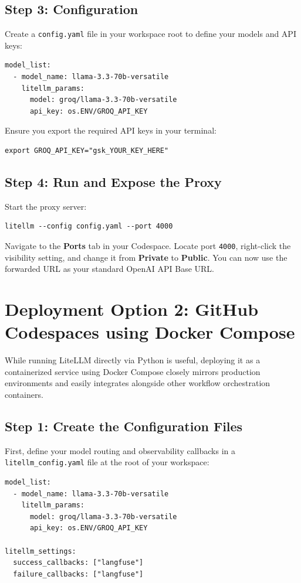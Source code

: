 \documentclass[12pt,a4paper]{article}
\begin{document}
\subsection{Step 3: Configuration}
Create a \texttt{config.yaml} file in your workspace root to define your models and API keys:
\begin{verbatim}
model_list:
  - model_name: llama-3.3-70b-versatile
    litellm_params:
      model: groq/llama-3.3-70b-versatile
      api_key: os.ENV/GROQ_API_KEY
\end{verbatim}
Ensure you export the required API keys in your terminal:
\begin{verbatim}
export GROQ_API_KEY="gsk_YOUR_KEY_HERE"
\end{verbatim}

\subsection{Step 4: Run and Expose the Proxy}
Start the proxy server:
\begin{verbatim}
litellm --config config.yaml --port 4000
\end{verbatim}
Navigate to the \textbf{Ports} tab in your Codespace. Locate port \texttt{4000}, right-click the visibility setting, and change it from \textbf{Private} to \textbf{Public}. You can now use the forwarded URL as your standard OpenAI API Base URL.

\section{Deployment Option 2: GitHub Codespaces using Docker Compose}
While running LiteLLM directly via Python is useful, deploying it as a containerized service using Docker Compose closely mirrors production environments and easily integrates alongside other workflow orchestration containers.

\subsection{Step 1: Create the Configuration Files}
First, define your model routing and observability callbacks in a \texttt{litellm\_config.yaml} file at the root of your workspace:
\begin{verbatim}
model_list:
  - model_name: llama-3.3-70b-versatile
    litellm_params:
      model: groq/llama-3.3-70b-versatile
      api_key: os.ENV/GROQ_API_KEY

litellm_settings:
  success_callbacks: ["langfuse"]
  failure_callbacks: ["langfuse"]
\end{verbatim}
\end{document}
